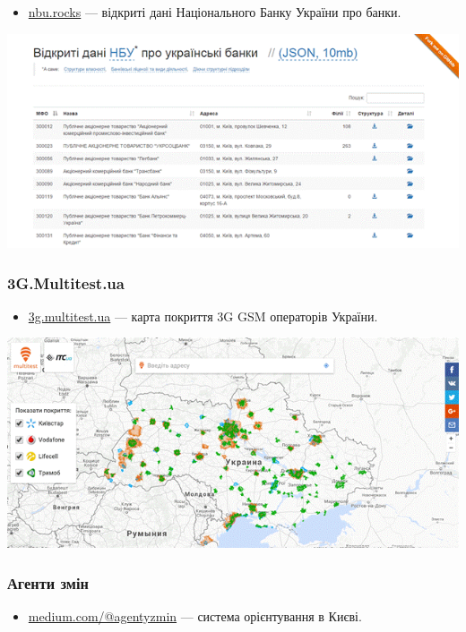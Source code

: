 \begin{itemize}
    \item \href{http://nbu.rocks/}{nbu.rocks} — відкриті дані Національного Банку України про банки.
\end{itemize}

\includegraphics{images/020.gif}

\subsubsection{3G.Multitest.ua}

\begin{itemize}
    \item \href{http://3g.multitest.ua/}{3g.multitest.ua} — карта покриття 3G GSM операторів України.
\end{itemize}

\includegraphics{images/021.gif}

\subsubsection{Агенти змін}

\begin{itemize}
    \item \href{https://medium.com/@agentyzmin}{medium.com/@agentyzmin} — система орієнтування в Києві.
\end{itemize}

